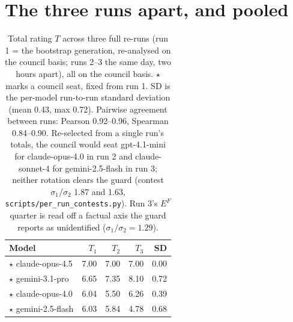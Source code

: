 \documentclass{article}
\begin{document}
\section{The three runs apart, and pooled}\label{the-three-runs-apart-and-pooled}

\begin{table}[H]
\caption{Total rating \(T\) across three full re-runs (run 1 = the bootstrap generation, re-analysed on the council basis; runs 2--3 the same day, two hours apart), all on the council basis. \ensuremath{\star} marks a council seat, fixed from run 1. SD is the per-model run-to-run standard deviation (mean 0.43, max 0.72). Pairwise agreement between runs: Pearson 0.92--0.96, Spearman 0.84--0.90. Re-selected from a single run's totals, the council would seat gpt-4.1-mini for claude-opus-4.0 in run 2 and claude-sonnet-4 for gemini-2.5-flash in run 3; neither rotation clears the guard (contest \(\sigma_1/\sigma_2\) 1.87 and 1.63, \protect\texttt{scripts/per\_\allowbreak{}run\_\allowbreak{}contests.py}). Run 3's \(E^{F}\) quarter is read off a factual axis the guard reports as unidentified (\(\sigma_1/\sigma_2 = 1.29\)).}
\label{tab-reruns}
\begin{center}\small
\begin{tabular}{@{}lrrrr@{}}
\toprule\noalign{}
Model & \(T_1\) & \(T_2\) & \(T_3\) & SD \\
\midrule\noalign{}
\ensuremath{\star} claude-opus-4.5 &\cellcolor[HTML]{2072B2}\textcolor[HTML]{FFFFFF}{7.00}&\cellcolor[HTML]{2072B2}\textcolor[HTML]{FFFFFF}{7.00}&\cellcolor[HTML]{2072B2}\textcolor[HTML]{FFFFFF}{7.00}&\cellcolor[HTML]{FFFFD9}\textcolor[HTML]{000000}{0.00} \\
\ensuremath{\star} gemini-3.1-pro &\cellcolor[HTML]{1F81B8}\textcolor[HTML]{FFFFFF}{6.65}&\cellcolor[HTML]{2164AB}\textcolor[HTML]{FFFFFF}{7.35}&\cellcolor[HTML]{234A9E}\textcolor[HTML]{FFFFFF}{8.10}&\cellcolor[HTML]{216AAE}\textcolor[HTML]{FFFFFF}{0.72} \\
\ensuremath{\star} claude-opus-4.0 &\cellcolor[HTML]{2397C1}\textcolor[HTML]{FFFFFF}{6.04}&\cellcolor[HTML]{33A7C2}\textcolor[HTML]{FFFFFF}{5.50}&\cellcolor[HTML]{1D91C0}\textcolor[HTML]{FFFFFF}{6.26}&\cellcolor[HTML]{78CABC}\textcolor[HTML]{000000}{0.39} \\
\ensuremath{\star} gemini-2.5-flash &\cellcolor[HTML]{2398C1}\textcolor[HTML]{FFFFFF}{6.03}&\cellcolor[HTML]{299DC1}\textcolor[HTML]{FFFFFF}{5.84}&\cellcolor[HTML]{4CBAC2}\textcolor[HTML]{000000}{4.78}&\cellcolor[HTML]{1F7BB5}\textcolor[HTML]{FFFFFF}{0.68} \\

\end{tabular}
\end{center}
\end{table}
\end{document}
